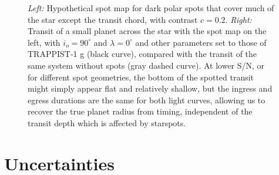 \begin{subappendices}
\begin{figure}
    \caption{\textsl{Left:} Hypothetical spot map for dark polar spots that cover much of the star except the transit chord, with contrast $c=0.2$. \textsl{Right:} Transit of a small planet across the star with the spot map on the left, with $i_o = 90^\circ$ and $\lambda = 0^\circ$ and other parameters set to those of TRAPPIST-1 g (black curve), compared with the transit of the same system without spots (gray dashed curve). At lower S/N, or for different spot geometries, the bottom of the spotted transit might simply appear flat and relatively shallow, but the ingress and egress durations are the same for both light curves, allowing us to recover the true planet radius from timing, independent of the transit depth which is affected by starspots.}
    \label{fig:map3}
\end{figure}


\section{Uncertainties}


\end{subappendices}
